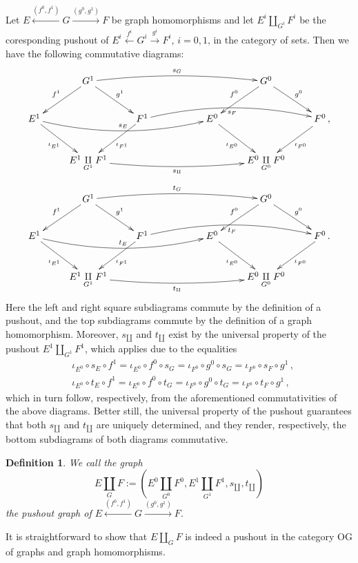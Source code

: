 \documentclass[12pt,times,a4paper]{amsart}
\newtheorem{definition}[theorem]{Definition}
\numberwithin{equation}{section}
\numberwithin{equation}{section}
\begin{document}
Let $E\stackrel{(f^0,f^1)}{\longleftarrow} G\stackrel{(g^0,g^1)}{\longrightarrow} F$ 
be graph homomorphisms and let $E^i\amalg_{G^i}F^i$ be the coresponding pushout of 
\mbox{$E^i\stackrel{f^i}{\leftarrow} G^i\stackrel{g^i}{\to} F^i$}, $i=0,1$, in the category of sets. Then
we have the following  commutative diagrams:
\begin{equation}
\xymatrix{
&G^1\ar[ld]_{f^1}\ar[rd]^{g^1}\ar@/^0.5pc/[rrrr]^{ s_G } && & & G^0\ar[ld]_{f^0}\ar[rd]^{g^0} &\\
E^1\ar[rd]_{\iota_{E^1}}\ar@/_1pc/[rrrr]^{s_E}
 && F^1\ar[ld]^{\iota_{F^1}}\ar@/^1pc/[rrrr]_{s_F}
 && E^0 \ar[rd]_{\iota_{E^0}}&& F^0\,,\ar[ld]^{\iota_{F^0}}\\
&E^1\underset{G^1}{\amalg}F^1\ar@/_0.5pc/[rrrr]_{s_\amalg}& && & E^0\underset{G^0}{\amalg}F^0&
}
\end{equation}
\begin{equation}
\xymatrix{
&G^1\ar[ld]_{f^1}\ar[rd]^{g^1}\ar@/^0.5pc/[rrrr]^{ t_G } && & & G^0\ar[ld]_{f^0}\ar[rd]^{g^0} &\\
E^1\ar[rd]_{\iota_{E^1}}\ar@/_1pc/[rrrr]^{t_E}
 && F^1\ar[ld]^{\iota_{F^1}}\ar@/^1pc/[rrrr]_{t_F}
 && E^0 \ar[rd]_{\iota_{E^0}}&& F^0\,.\ar[ld]^{\iota_{F^0}}\\
&E^1\underset{G^1}{\amalg}F^1\ar@/_0.5pc/[rrrr]_{t_\amalg}& && & E^0\underset{G^0}{\amalg}F^0&
}
\end{equation}
Here the left and right square subdiagrams commute by the definition of a pushout, and the top
subdiagrams commute by the definition of a graph homomorphism. Moreover,
$s_\amalg$ and $t_\amalg$ exist by the universal property of the pushout 
$E^1\amalg_{G^1}F^1$, which applies
due to the equalities
\begin{align}
&\iota_{E^0}\circ s_E\circ f^1=\iota_{E^0}\circ f^0\circ s_G=\iota_{F^0}\circ g^0\circ s_G
=\iota_{F^0}\circ s_F\circ g^1\,,\nonumber\\
&\iota_{E^0}\circ t_E\circ f^1=\iota_{E^0}\circ f^0\circ t_G=\iota_{F^0}\circ g^0\circ t_G
=\iota_{F^0}\circ t_F\circ g^1\,,
\end{align}
which in turn follow, respectively, from the aforementioned commutativities of the above diagrams. Better still, the universal property of the pushout guarantees 
that both $s_{\coprod}$ and $t_{\coprod}$ are uniquely determined, and they render, respectively, the bottom subdiagrams of both diagrams commutative.

\begin{definition}
We call the graph 
\begin{equation*}
E\underset{G}{\amalg}F:=
\left(E^0\underset{G^0}{\amalg}F^0,E^1\underset{G^1}{\amalg}F^1,s_\amalg,t_\amalg\right)
\end{equation*} 
the \emph{pushout graph} of
$E\stackrel{(f^0,f^1)}{\longleftarrow} G\stackrel{(g^0,g^1)}{\longrightarrow} F$.
\end{definition}
\noindent 
It is straightforward to show that $E{\amalg}_GF$ is indeed a pushout in the category {\rm OG} of graphs and graph homomorphisms.
\end{document}
